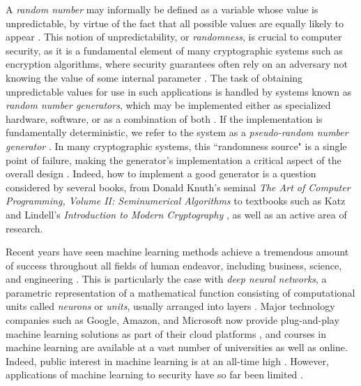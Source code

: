\documentclass[12pt, titlepage]{report}
\theoremstyle{definition}
\begin{document}
A \emph{random number} may informally be defined as a variable whose value is unpredictable, by virtue of the fact that all possible values are equally likely to appear \cite[p. 7]{barker2007recommendation}. This notion of unpredictability, or \emph{randomness}, is crucial to computer security, as it is a fundamental element of many cryptographic systems such as encryption algorithms, where security guarantees often rely on an adversary not knowing the value of some internal parameter \cite[p. 169]{menezes1996handbook} \cite[p. 1]{kelsey1998cryptanalytic}. The task of obtaining unpredictable values for use in such applications is handled by systems known as \emph{random number generators}, which may be implemented either as specialized hardware, software, or as a combination of both \cite[p. 196, 172]{menezes1996handbook}. If the implementation is fundamentally deterministic, we refer to the system as a \emph{pseudo-random number generator} \cite[p. 169]{menezes1996handbook}. In many cryptographic systems, this ``randomness source" is a single point of failure, making the generator's implementation a critical aspect of the overall design \cite[p. 2]{kelsey1998cryptanalytic}. Indeed, how to implement a good generator is a question considered by several books, from Donald Knuth's seminal \textit{The Art of Computer Programming, Volume II: Seminumerical Algorithms} \cite{donald1998art} to textbooks such as Katz and Lindell's \textit{Introduction to Modern Cryptography} \cite{katz2014introduction}, as well as an active area of research.

Recent years have seen machine learning methods achieve a tremendous amount of success throughout all fields of human endeavor, including business, science, and engineering \cite[p. 24-29]{russel2009artificial}. This is particularly the case with \emph{deep neural networks}, a parametric representation of a mathematical function consisting of computational units called \emph{neurons} or \emph{units}, usually arranged into layers \cite[p. 731-732]{russel2009artificial}. Major technology companies such as Google, Amazon, and Microsoft now provide plug-and-play machine learning solutions as part of their cloud platforms \cite{google2018automl} \cite{amazon2018aws} \cite{microsoft2018azure}, and courses in machine learning are available at a vast number of universities as well as online. Indeed, public interest in machine learning is at an all-time high \cite{forbes2016short}. However, applications of machine learning to security have so far been limited \cite{abadi2016learning}.
\end{document}
